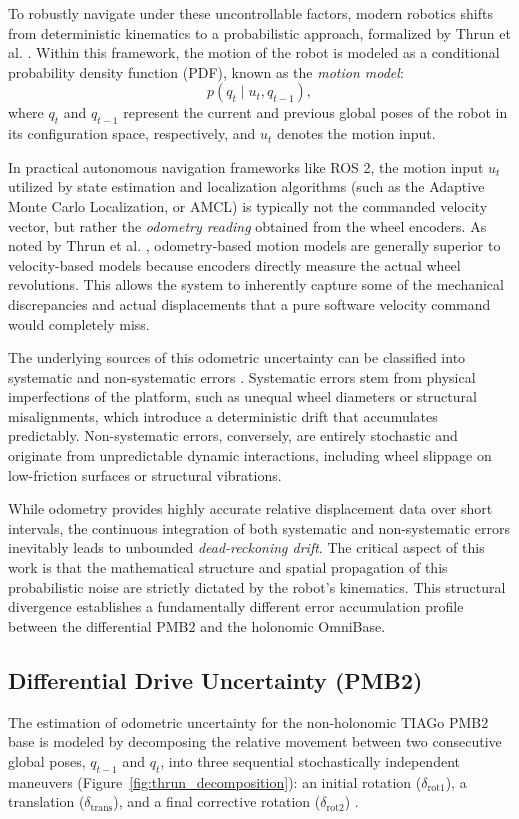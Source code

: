 To robustly navigate under these uncontrollable factors, modern robotics shifts from deterministic kinematics to a probabilistic approach, formalized by Thrun et al. \cite{thrun_probabilistic_2005}. Within this framework, the motion of the robot is modeled as a conditional probability density function (PDF), known as the \emph{motion model}:
\begin{equation}
    p(q_t \mid u_t, q_{t-1}),
\end{equation}
where $q_t$ and $q_{t-1}$ represent the current and previous global poses of the robot in its configuration space, respectively, and $u_t$ denotes the motion input.

In practical autonomous navigation frameworks like ROS 2, the motion input $u_t$ utilized by state estimation and localization algorithms (such as the Adaptive Monte Carlo Localization, or AMCL) is typically not the commanded velocity vector, but rather the \emph{odometry reading} obtained from the wheel encoders. As noted by Thrun et al. \cite{thrun_probabilistic_2005}, odometry-based motion models are generally superior to velocity-based models because encoders directly measure the actual wheel revolutions. This allows the system to inherently capture some of the mechanical discrepancies and actual displacements that a pure software velocity command would completely miss.

The underlying sources of this odometric uncertainty can be classified into systematic and non-systematic errors \cite{thrun_probabilistic_2005}. Systematic errors stem from physical imperfections of the platform, such as unequal wheel diameters or structural misalignments, which introduce a deterministic drift that accumulates predictably. Non-systematic errors, conversely, are entirely stochastic and originate from unpredictable dynamic interactions, including wheel slippage on low-friction surfaces or structural vibrations. 

While odometry provides highly accurate relative displacement data over short intervals, the continuous integration of both systematic and non-systematic errors inevitably leads to unbounded \emph{dead-reckoning drift}. The critical aspect of this work is that the mathematical structure and spatial propagation of this probabilistic noise are strictly dictated by the robot's kinematics. This structural divergence establishes a fundamentally different error accumulation profile between the differential PMB2 and the holonomic OmniBase.

\subsection{Differential Drive Uncertainty (PMB2)}
\label{subsec:differential_uncertainty}
The estimation of odometric uncertainty for the non-holonomic TIAGo PMB2 base is modeled by decomposing the relative movement between two consecutive global poses, $q_{t-1}$ and $q_t$, into three sequential stochastically independent maneuvers (Figure~\ref{fig:thrun_decomposition}): an initial rotation ($\delta_{\text{rot1}}$), a translation ($\delta_{\text{trans}}$), and a final corrective rotation ($\delta_{\text{rot2}}$) \cite{thrun_probabilistic_2005}.

